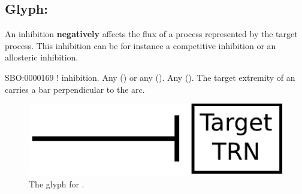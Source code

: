 
\subsection{Glyph: }\label{sec:inhibition}

An inhibition \textbf{negatively} affects the flux of a process represented by the target process. This inhibition can be for instance a competitive inhibition or an allosteric inhibition. 

\begin{glyphDescription}
 \glyphSboTerm SBO:0000169 ! inhibition.
 \glyphOrigin Any  () or any  ().
 \glyphTarget Any  ().
 \glyphNode The target extremity of an  carries a bar perpendicular to the arc.
 \end{glyphDescription}

\begin{figure}[H]
  \centering
  \includegraphics[scale = 0.5]{images/inhibition}
  \caption{The \PD glyph for .}
  \label{fig:inhibition}
\end{figure}

